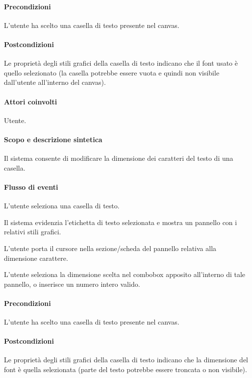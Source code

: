 \paragraph{Precondizioni} L'utente ha scelto una casella di testo presente nel canvas.
\paragraph{Postcondizioni} Le propriet\` a degli stili grafici della casella di testo indicano che il font usato \` e quello selezionato (la casella potrebbe essere vuota e quindi non visibile dall'utente all'interno del canvas).

\paragraph{Attori coinvolti} Utente.
\paragraph{Scopo e descrizione sintetica} 
Il sistema consente di modificare la dimensione dei caratteri del testo di una casella.
\paragraph{Flusso di eventi}
\begin{elenconumerato}[\textbf{}]{\subsubsecindent}
\item L'utente seleziona una casella di testo.
\item Il sistema evidenzia l'etichetta di testo selezionata e mostra un pannello con i relativi stili grafici.
\item L'utente porta il cursore nella sezione/scheda del pannello relativa alla dimensione carattere.
\item L'utente seleziona la dimensione scelta nel combobox apposito all'interno di tale pannello, o inserisce un numero intero valido.
\end{elenconumerato}
\paragraph{Precondizioni}L'utente ha scelto una casella di testo presente nel canvas.
\paragraph{Postcondizioni}Le propriet\`a degli stili grafici della casella di testo indicano che la dimensione del font \` e quella selezionata (parte del testo potrebbe essere troncata o non visibile).

